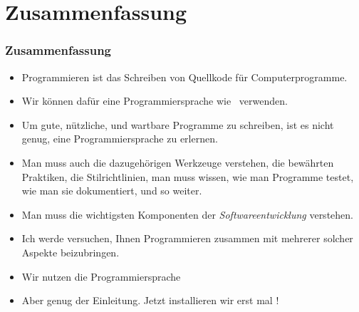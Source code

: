 \documentclass[aspectratio=169,mathserif,notheorems]{beamer}%
\begin{document}
\section{Zusammenfassung}%
%
\begin{frame}\frametitle{Zusammenfassung}%
%
\begin{itemize}%
\item Programmieren ist das Schreiben von Quellkode für Computerprogramme.%
\item<2-> Wir können dafür eine Programmiersprache wie \python\ verwenden.%
\item<3-> Um gute, nützliche, und wartbare Programme zu schreiben, ist es nicht genug, eine Programmiersprache zu erlernen.%
\item<4-> Man muss auch die dazugehörigen Werkzeuge verstehen, die bewährten Praktiken, die Stilrichtlinien, man muss wissen, wie man Programme testet, wie man sie dokumentiert, und so weiter.%
\item<5-> Man muss die wichtigsten Komponenten der \emph{Softwareentwicklung} verstehen.
\item<6-> Ich werde versuchen, Ihnen Programmieren zusammen mit mehrerer solcher Aspekte beizubringen.%
\item<7-> Wir nutzen die Programmiersprache \python{}%
\item<12-> Aber genug der Einleitung. Jetzt installieren wir erst mal \python!%
\end{itemize}%
\end{frame}%
%
\endPresentation%
\end{document}
